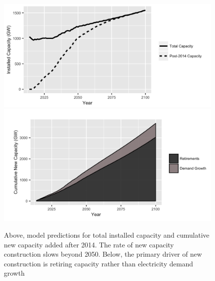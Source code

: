 \documentclass[preprint, 12pt]{elsarticle}
\begin{document}
\begin{figure}
\begin{center}
\includegraphics[scale=.35]{Fig4_2b.png}
\includegraphics[scale=.35]{Fig4_3.png}
\end{center}
\caption{Above, model predictions for total installed capacity and cumulative new capacity added after 2014. The rate of new capacity construction slows beyond 2050. Below, the primary driver of new construction is retiring capacity rather than electricity demand growth}
\end{figure}
\end{document}
